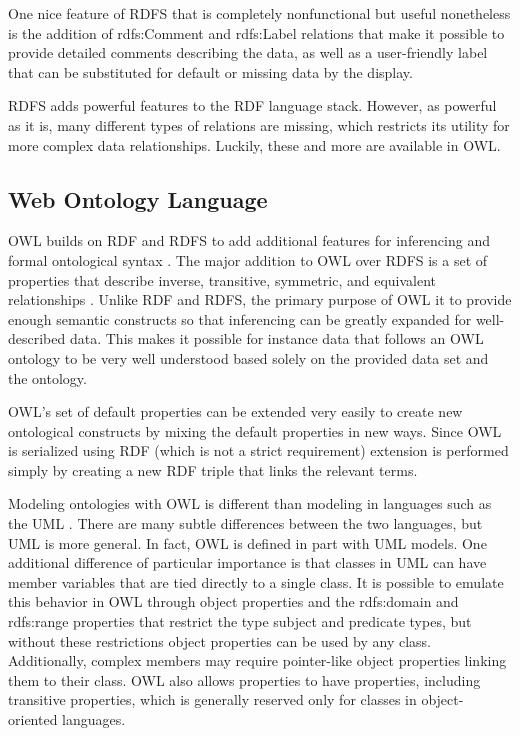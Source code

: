One nice feature of RDFS that is completely nonfunctional but useful
nonetheless is the addition of rdfs:Comment and rdfs:Label relations that make
it possible to provide detailed comments describing the data, as well as a
user-friendly label that can be substituted for default or missing data by the
display.

RDFS adds powerful features to the RDF language stack. However, as powerful as
it is, many different types of relations are missing, which restricts its
utility for more complex data relationships. Luckily, these and more are
available in OWL.

\subsection{Web Ontology Language}

OWL builds on RDF and RDFS to add additional
features for inferencing and formal ontological syntax \cite{owl-2}. The major
addition to OWL over RDFS is a set of properties that describe inverse,
transitive, symmetric, and equivalent relationships
\cite{allemang_semantic_2008}. Unlike RDF and RDFS, the primary purpose of OWL
it to provide enough semantic constructs so that inferencing can be greatly
expanded for well-described data. This makes it possible for instance data that
follows an OWL ontology to be very well understood based solely on the provided
data set and the ontology.

OWL's set of default properties can be extended very easily to create new
ontological constructs by mixing the default properties in new ways. Since OWL
is serialized using RDF (which is not a strict requirement) extension is
performed simply by creating a new RDF triple that links the relevant terms.

Modeling ontologies with OWL is different than modeling in languages such as the
UML \cite{UML}. There are many subtle differences
between the two languages, but UML is more general. In fact, OWL is
defined in part with UML models. One additional difference of particular
importance is that classes in UML can have member variables that are tied
directly to a single class. It is possible to emulate this behavior in OWL
through object properties and the rdfs:domain and rdfs:range properties that
restrict the type subject and predicate types, but without these restrictions
object properties can be used by any class. Additionally, complex members
may require pointer-like object properties linking them to their class. OWL also
allows properties to have properties, including transitive properties, which is
generally reserved only for classes in object-oriented languages.


